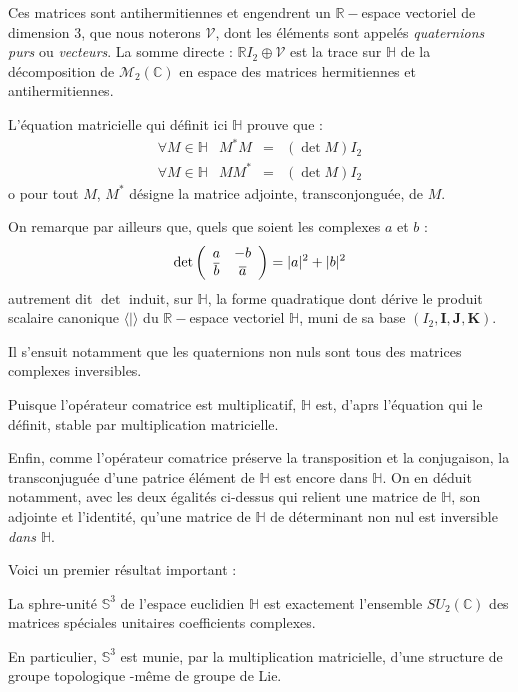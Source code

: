 Ces matrices sont antihermitiennes et engendrent un $\mathbb{R}-$espace vectoriel de dimension $3$, %
que nous noterons $\mathcal{V}$, dont les \'el\'ements sont appel\'es \emph{quaternions purs} ou \emph{vecteurs}. %
La somme directe : $\mathbb{R}I_2\oplus\mathcal{V}$ est la trace sur $\mathbb{H}$ de la d\'ecomposition de $\mathcal{M}_2(\mathbb{C})$ %
en espace des matrices hermitiennes et antihermitiennes.

\par
L'\'equation matricielle qui d\'efinit ici $\mathbb{H}$ prouve que :
\[
\begin{array}{lccr}
\forall M\in\mathbb{H}& M^{\ast}M&=&(\det M)I_2\\
\forall M\in\mathbb{H}& MM^{\ast}&=&(\det M)I_2
\end{array}
\]
o pour tout $M$, $M^{\ast}$ d\'esigne la matrice adjointe, transconjongu\'ee, de $M$.

\par
On remarque par ailleurs que, quels que soient les complexes $a$ et $b$ :
\[\det\left(\begin{array}{cc}a&-b\\\overline{b}&\overline{a}\end{array}\right)=|a|^2+|b|^2\]
autrement dit $\det$ induit, sur $\mathbb{H}$, la forme quadratique dont d\'erive le produit scalaire canonique $\langle | \rangle$ du $\mathbb{R}-$espace vectoriel $\mathbb{H}$, %
muni de sa base $(I_2,\mathbf{I},\mathbf{J},\mathbf{K})$.

\par
Il s'ensuit notamment que les quaternions non nuls sont tous des matrices complexes inversibles.

\par
Puisque l'op\'erateur \og{}comatrice\fg{} est multiplicatif, $\mathbb{H}$ est, d'aprs l'\'equation qui le d\'efinit, stable par multiplication matricielle.

\par
Enfin, comme l'op\'erateur \og{}comatrice\fg{} pr\'eserve la transposition et la conjugaison, %
la transconjugu\'ee d'une patrice \'el\'ement de $\mathbb{H}$ est encore dans $\mathbb{H}$. %
On en d\'eduit notamment, avec les deux \'egalit\'es ci-dessus qui relient une matrice de $\mathbb{H}$, son adjointe et l'identit\'e, %
qu'une matrice de $\mathbb{H}$ de d\'eterminant non nul est inversible \emph{dans $\mathbb{H}$}.

\par
Voici un premier r\'esultat important :

\begin{prop}
La sphre-unit\'e $\mathbb{S}^3$ de l'espace euclidien $\mathbb{H}$ est exactement l'ensemble $SU_2(\mathbb{C})$ des matrices sp\'eciales unitaires  coefficients complexes.
\par
En particulier, $\mathbb{S}^3$ est munie, par la multiplication matricielle, d'une structure de groupe topologique -m\^eme de groupe de Lie.
\end{prop}

